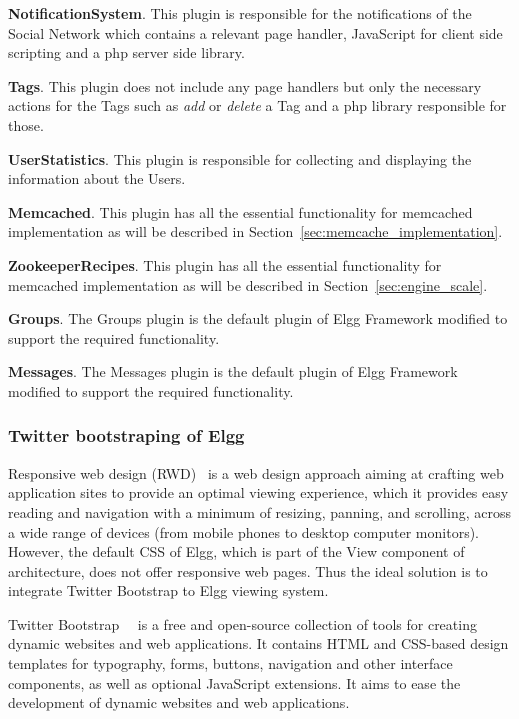 \textbf{NotificationSystem}. This plugin is responsible for the notifications of the Social Network which contains a relevant page handler, JavaScript for client side scripting and a php server side library.

\textbf{Tags}. This plugin does not include any page handlers but only the necessary actions for the Tags such as {\it add} or {\it delete} a Tag and a php library responsible for those. 

\textbf{UserStatistics}. This plugin is responsible for collecting and displaying the information about the Users.

\textbf{Memcached}. This plugin has all the essential functionality for memcached implementation as will be described in Section~\ref{sec:memcache_implementation}.

\textbf{ZookeeperRecipes}. This plugin has all the essential functionality for memcached implementation as will be described in Section~\ref{sec:engine_scale}.

\textbf{Groups}. The Groups plugin is the default plugin of Elgg Framework modified to support the required functionality.

\textbf{Messages}. The Messages plugin is the default plugin of Elgg Framework modified to support the required functionality.

\subsubsection{Twitter bootstraping of Elgg}
Responsive web design (RWD)~\cite{natda2013responsive} is a web design approach aiming at crafting web application sites to provide an optimal viewing experience, which it provides easy reading and navigation with a minimum of resizing, panning, and scrolling, across a wide range of devices (from mobile phones to desktop computer monitors). However, the default CSS of Elgg, which is part of the View component of architecture, does not offer responsive web pages. Thus the ideal solution is to integrate Twitter Bootstrap to Elgg viewing system. 

Twitter Bootstrap~\cite{twitter_bootstrap}~\cite{cochran2012twitter} is a free and open-source collection of tools for creating dynamic websites and web applications. It contains HTML and CSS-based design templates for typography, forms, buttons, navigation and other interface components, as well as optional JavaScript extensions. It aims to ease the development of dynamic websites and web applications. 


